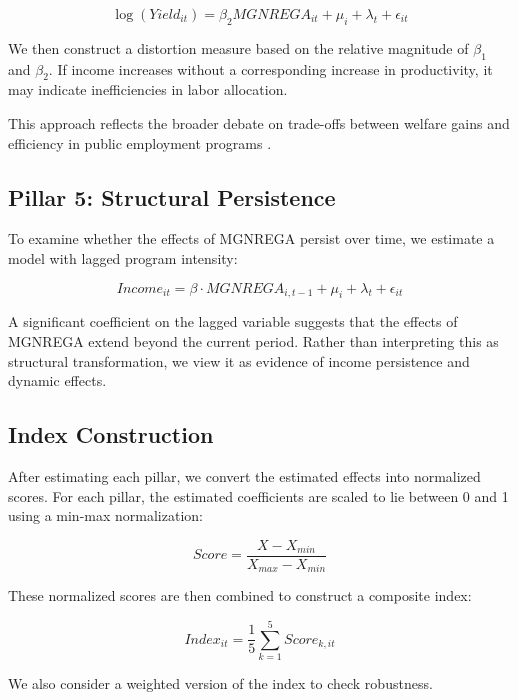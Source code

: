 \documentclass[12pt]{article}
\begin{document}
\begin{equation}
\log(Yield_{it}) = \beta_2 MGNREGA_{it} + \mu_i + \lambda_t + \epsilon_{it}
\end{equation}

We then construct a distortion measure based on the relative magnitude of $\beta_1$ and $\beta_2$. If income increases without a corresponding increase in productivity, it may indicate inefficiencies in labor allocation.

This approach reflects the broader debate on trade-offs between welfare gains and efficiency in public employment programs \citep{Muralidharan2017}.


\subsection{Pillar 5: Structural Persistence}

To examine whether the effects of MGNREGA persist over time, we estimate a model with lagged program intensity:

\begin{equation}
Income_{it} = \beta \cdot MGNREGA_{i,t-1} + \mu_i + \lambda_t + \epsilon_{it}
\end{equation}

A significant coefficient on the lagged variable suggests that the effects of MGNREGA extend beyond the current period. Rather than interpreting this as structural transformation, we view it as evidence of income persistence and dynamic effects.

\subsection{Index Construction}

After estimating each pillar, we convert the estimated effects into normalized scores. For each pillar, the estimated coefficients are scaled to lie between 0 and 1 using a min-max normalization:

\begin{equation}
Score = \frac{X - X_{min}}{X_{max} - X_{min}}
\end{equation}

These normalized scores are then combined to construct a composite index:

\begin{equation}
Index_{it} = \frac{1}{5} \sum_{k=1}^{5} Score_{k,it}
\end{equation}

We also consider a weighted version of the index to check robustness.
\end{document}
